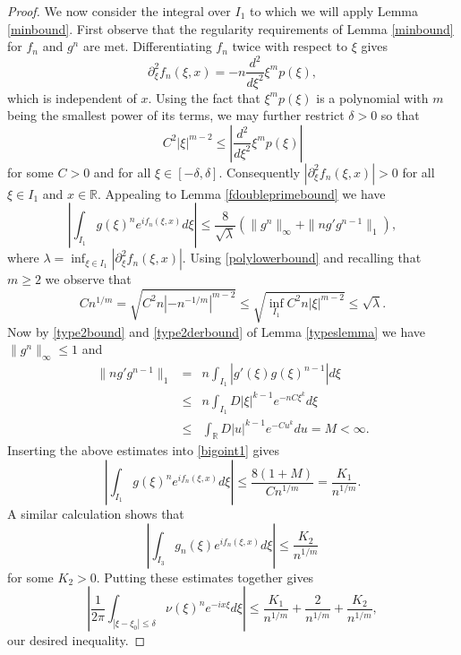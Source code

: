 \documentclass{article}
\theoremstyle{theorem}
\theoremstyle{remark}
\begin{document}
\begin{proof}
We now consider the integral over $I_1$ to which we will apply Lemma \ref{minbound}. First observe that the regularity requirements of Lemma \ref{minbound} for $f_n$ and $g^n$ are met. Differentiating $f_n$ twice with respect to $\xi$ gives
\begin{equation*}
 \partial_{\xi}^2 f_n(\xi,x)=-n\frac{d^2}{d\xi^2}\xi^mp(\xi),
\end{equation*}
which is independent of $x$. Using the fact that $\xi^mp(\xi)$ is a polynomial with
$m$ being the smallest power of its terms, we may further restrict $\delta>0$ so
that
\begin{equation}\label{polylowerbound}
 C^2|\xi|^{m-2}\leq \left|\frac{d^2}{d\xi^2}\xi^mp(\xi)\right|
\end{equation}
for some $C>0$ and for all $\xi\in[-\delta,\delta]$. Consequently $|\partial_{\xi}^2 f_n(\xi,x)|> 0$ for all $\xi\in I_1$ and $x\in\mathbb{R}$. Appealing to Lemma \ref{fdoubleprimebound} we have
\begin{equation}\label{bigoint1}
 \left|\int_{I_1}g(\xi)^ne^{if_n(\xi,x)}d\xi\right|\leq\frac{8}{\sqrt{\lambda}}(\|g^n\|_{\infty}+\|ng'g^{n-1}\|_1),
\end{equation}
where $\lambda=\inf_{\xi\in I_1}|\partial_{\xi}^2 f_n(\xi,x)|$. Using \eqref{polylowerbound} and recalling that $m\geq 2$ we observe that
\begin{equation*}
Cn^{1/m}=\sqrt{C^2n|-n^{-1/m}|^{m-2}}\leq\sqrt{\inf_{I_1}
C^2n|\xi|^{m-2}}\leq \sqrt{\lambda}.
\end{equation*}
Now by \eqref{type2bound} and \eqref{type2derbound} of Lemma \ref{typeslemma} we have $\|g^n\|_{\infty}\leq 1$ and
\begin{eqnarray*}
 \|ng'g^{n-1}\|_1&=&n\int_{I_1}|g'(\xi)g(\xi)^{n-1}|d\xi\\
&\leq& n\int_{I_1}D|\xi|^{k-1}e^{-nC\xi^k}d\xi\\
&\leq&\int_{\mathbb{R}}D|u|^{k-1}e^{-Cu^k}du=M<\infty.
\end{eqnarray*}
Inserting the above estimates into \eqref{bigoint1} gives
\begin{equation*}
 \left|\int_{I_1}g(\xi)^ne^{if_n(\xi,x)}d\xi\right|\leq\frac{8(1+M)}{Cn^{1/m}}=\frac{K_1}{n^{1/m}}.
\end{equation*}
A similar calculation shows that 
\begin{equation*}
\left|\int_{I_3}g_n(\xi)e^{if_n(\xi,x)}d\xi\right|\leq\frac{K_2}{n^{1/m}}
\end{equation*}
for some $K_2>0$. Putting these estimates together gives
\begin{equation*}
  \left|\frac{1}{2\pi}\int_{|\xi-\xi_0|\leq \delta}\nu(\xi)^n
e^{-ix\xi}d\xi\right|\leq
\frac{K_1}{n^{1/m}}+\frac{2}{n^{1/m}}+\frac{K_2}{n^{1/m}},
\end{equation*}
our desired inequality.
\end{proof}
\end{document}
